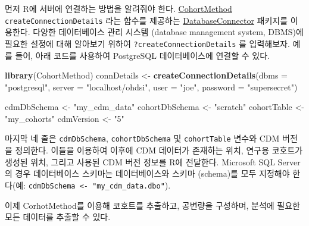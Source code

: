 \documentclass[11pt]{book}
\newenvironment{Shaded}{\begin{snugshade}}{\end{snugshade}}
\newcommand{\KeywordTok}[1]{\textcolor[rgb]{0.13,0.29,0.53}{\textbf{#1}}}
\newcommand{\DataTypeTok}[1]{\textcolor[rgb]{0.13,0.29,0.53}{#1}}
\newcommand{\StringTok}[1]{\textcolor[rgb]{0.31,0.60,0.02}{#1}}
\newcommand{\NormalTok}[1]{#1}
\theoremstyle{definition}
\theoremstyle{definition}
\theoremstyle{definition}
\theoremstyle{remark}
\begin{document}
먼저 R에 서버에 연결하는 방법을 알려줘야 한다.
\href{https://ohdsi.github.io/CohortMethod/}{CohortMethod}
\texttt{createConnectionDetails} 라는 함수를 제공하는
\href{https://ohdsi.github.io/DatabaseConnector/}{DatabaseConnector}
패키지를 이용한다. 다양한 데이터베이스 관리 시스템 (database management
system, DBMS)에 필요한 설정에 대해 알아보기 위하여
\texttt{?createConnectionDetails} 를 입력해보자. 예를 들어, 아래 코드를
사용하여 PostgreSQL 데이터베이스에 연결할 수 있다.

\begin{Shaded}
\begin{Highlighting}[]
\KeywordTok{library}\NormalTok{(CohortMethod)}
\NormalTok{connDetails <-}\StringTok{ }\KeywordTok{createConnectionDetails}\NormalTok{(}\DataTypeTok{dbms =} \StringTok{"postgresql"}\NormalTok{,}
                                       \DataTypeTok{server =} \StringTok{"localhost/ohdsi"}\NormalTok{,}
                                       \DataTypeTok{user =} \StringTok{"joe"}\NormalTok{,}
                                       \DataTypeTok{password =} \StringTok{"supersecret"}\NormalTok{)}

\NormalTok{cdmDbSchema <-}\StringTok{ "my_cdm_data"}
\NormalTok{cohortDbSchema <-}\StringTok{ "scratch"}
\NormalTok{cohortTable <-}\StringTok{ "my_cohorts"}
\NormalTok{cdmVersion <-}\StringTok{ "5"}
\end{Highlighting}
\end{Shaded}

마지막 네 줄은 \texttt{cdmDbSchema}, \texttt{cohortDbSchema} 및
\texttt{cohortTable} 변수와 CDM 버전을 정의한다. 이들을 이용하여 이후에
CDM 데이터가 존재하는 위치, 연구용 코호트가 생성된 위치, 그리고 사용된
CDM 버전 정보를 R에 전달한다. Microsoft SQL Server의 경우 데이터베이스
스키마는 데이터베이스와 스키마 (schema)를 모두 지정해야 한다(예:
\texttt{cdmDbSchema\ \textless{}-\ "my\_cdm\_data.dbo"}).

이제 CorhotMethod를 이용해 코호트를 추출하고, 공변량을 구성하며, 분석에
필요한 모든 데이터를 추출할 수 있다.
\end{document}

